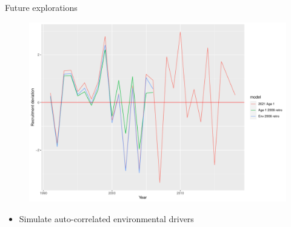 \documentclass[
  ignorenonframetext,
]{beamer}
\providecommand{\tightlist}{%
  \setlength{\itemsep}{0pt}\setlength{\parskip}{0pt}}\usepackage{longtable,booktabs,array}
\begin{document}
\begin{frame}[fragile]
\begin{block}{Future explorations}
\begin{figure}

{\centering \includegraphics{presentation_files/figure-beamer/unnamed-chunk-8-1.pdf}

}

\end{figure}

\pause

\begin{itemize}
\tightlist
\item
  Simulate auto-correlated environmental drivers
\end{itemize}
\end{block}
\end{frame}

\begin{frame}{}
\protect\hypertarget{section}{}
\end{frame}
\end{document}
